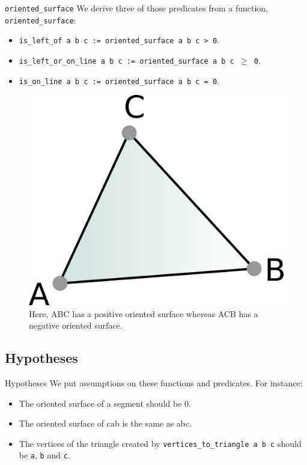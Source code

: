 \documentclass[18pt]{beamer}
\begin{document}
\begin{frame}{\tt oriented\_surface}
We derive three of those predicates from a function, {\tt oriented\_surface}:
{\small   \begin{itemize}
\item<2-> {\tt is\_left\_of a b c := oriented\_surface a b c > 0}.
  \item<3-> {\tt is\_left\_or\_on\_line a b c := oriented\_surface a b c $\geq$ 0}.
  \item<4> {\tt is\_on\_line a b c := oriented\_surface a b c = 0}.
 \end{itemize} }


  \begin{figure}
  \centering
  \includegraphics[scale=1]{Surface}
  \caption{\label{surface} Here, ABC has a positive oriented surface whereas ACB has a negative oriented surface.}
\end{figure}


\end{frame}


\subsection{Hypotheses}

\begin{frame}{Hypotheses}
 We put assumptions on these functions and predicates. For instance:
 \begin{itemize}
  \item<1-> The oriented surface of a segment should be 0.
  \item<2-> The oriented surface of cab is the same as abc.
  \item<3-> The vertices of the triangle created by {\tt vertices\_to\_triangle a b c} should be  {\tt a}, {\tt b} and {\tt c}.
 \end{itemize}

\end{frame}
\end{document}
